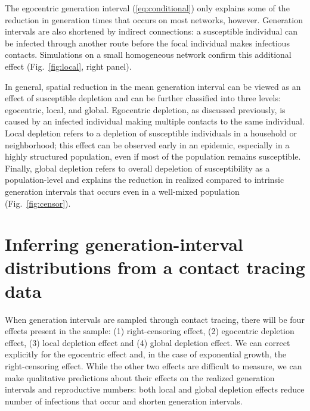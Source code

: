 \documentclass[12pt]{article}
\newcommand{\eref}[1]{(\ref{eq:#1})}
\newcommand{\fref}[1]{Fig.~\ref{fig:#1}}
\begin{document}
The egocentric generation interval \eref{conditional} only explains some of the reduction in generation times that occurs on most networks, however.
Generation intervals are also shortened by indirect connections: a susceptible individual can be infected through another route before the focal individual makes infectious contacts.
Simulations on a small homogeneous network confirm this additional effect (\fref{local}, right panel). 

In general, spatial reduction in the mean generation interval can be viewed as an effect of susceptible depletion and can be further classified into three levels: egocentric, local, and global.
Egocentric depletion, as discussed previously, is caused by an infected individual making multiple contacts to the same individual.
Local depletion refers to a depletion of susceptible individuals in a household or neighborhood;
this effect can be observed early in an epidemic, especially in a highly structured population, even if most of the population remains susceptible.
Finally, global depletion refers to overall depeletion of susceptibility as a population-level and explains the reduction in realized compared to intrinsic generation intervals that occurs even in a well-mixed population (\fref{censor}). 

\section{Inferring generation-interval distributions from a contact tracing data}

When generation intervals are sampled through contact tracing, there will be four effects present in the sample: (1) right-censoring effect, (2) egocentric depletion effect, (3) local depletion effect and (4) global depletion effect.
We can correct explicitly for the egocentric effect and, in the case of exponential growth, the right-censoring effect.
While the other two effects are difficult to measure, we can make qualitative predictions about their effects on the realized generation intervals and reproductive numbers: 
both local and global depletion effects reduce number of infections that occur and shorten generation intervals.
\end{document}
